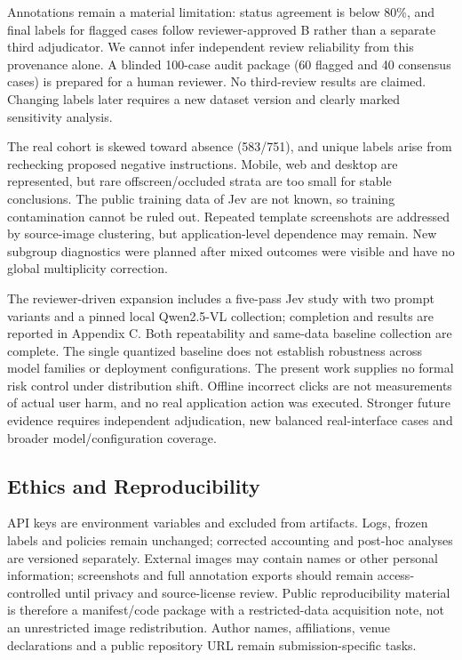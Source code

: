 \documentclass[10pt]{article}
\begin{document}
Annotations remain a material limitation: status agreement is below 80\%, and final labels for flagged cases follow reviewer-approved B rather than a separate third adjudicator. We cannot infer independent review reliability from this provenance alone. A blinded 100-case audit package (60 flagged and 40 consensus cases) is prepared for a human reviewer. No third-review results are claimed. Changing labels later requires a new dataset version and clearly marked sensitivity analysis.

The real cohort is skewed toward absence (583/751), and unique labels arise from rechecking proposed negative instructions. Mobile, web and desktop are represented, but rare offscreen/occluded strata are too small for stable conclusions. The public training data of Jev are not known, so training contamination cannot be ruled out. Repeated template screenshots are addressed by source-image clustering, but application-level dependence may remain. New subgroup diagnostics were planned after mixed outcomes were visible and have no global multiplicity correction.

The reviewer-driven expansion includes a five-pass Jev study with two prompt variants and a pinned local Qwen2.5-VL collection; completion and results are reported in Appendix C. Both repeatability and same-data baseline collection are complete. The single quantized baseline does not establish robustness across model families or deployment configurations. The present work supplies no formal risk control under distribution shift. Offline incorrect clicks are not measurements of actual user harm, and no real application action was executed. Stronger future evidence requires independent adjudication, new balanced real-interface cases and broader model/configuration coverage.

\subsection{Ethics and Reproducibility}
API keys are environment variables and excluded from artifacts. Logs, frozen labels and policies remain unchanged; corrected accounting and post-hoc analyses are versioned separately. External images may contain names or other personal information; screenshots and full annotation exports should remain access-controlled until privacy and source-license review. Public reproducibility material is therefore a manifest/code package with a restricted-data acquisition note, not an unrestricted image redistribution. Author names, affiliations, venue declarations and a public repository URL remain submission-specific tasks.
\end{document}
